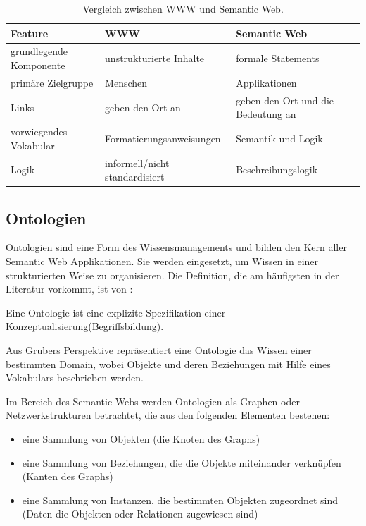 \begin{table}[h]
\begin{center}
\begin{tabular}{ | p{3 cm} | p{4 cm} | p{4 cm} | }
\hline
\textbf{Feature} & \textbf{WWW} & \textbf{Semantic Web} \\
\hline
grundlegende Komponente & unstrukturierte Inhalte & formale Statements \\ 
\hline
primäre Zielgruppe & Menschen & Applikationen \\ 
\hline
Links & geben den Ort an & geben den Ort und die Bedeutung an \\ 
\hline
vorwiegendes Vokabular & Formatierungsanweisungen & Semantik und Logik \\ 
\hline
Logik & informell/nicht standardisiert & Beschreibungslogik \\ 
\hline
\end{tabular}
\caption{Vergleich zwischen WWW und Semantic Web.}
\label{table:1}
\end{center}
\end{table}

\subsection{Ontologien}

Ontologien sind eine Form des Wissensmanagements und bilden den Kern aller Semantic Web Applikationen. 
Sie werden eingesetzt, um Wissen in einer strukturierten Weise zu organisieren.
Die Definition, die am häufigsten in der Literatur vorkommt, ist von \citet{gruber_translation_1993}:

\begin{definition}
  Eine Ontologie ist eine explizite Spezifikation einer Konzeptualisierung(Begriffsbildung).
\end{definition}

\noindent Aus Grubers Perspektive repräsentiert eine Ontologie das Wissen einer bestimmten Domain, wobei Objekte und deren Beziehungen mit Hilfe eines Vokabulars beschrieben werden. \citep[vgl.]{breitman_semantic_2007}

Im Bereich des Semantic Webs werden Ontologien als Graphen oder Netzwerkstrukturen betrachtet, die aus den folgenden Elementen bestehen:

\begin{itemize}
	\item eine Sammlung von Objekten (die Knoten des Graphs)
	\item eine Sammlung von Beziehungen, die die Objekte miteinander verknüpfen (Kanten des Graphs)
	\item eine Sammlung von Instanzen, die bestimmten Objekten zugeordnet sind (Daten die Objekten oder Relationen zugewiesen sind) \citep[vgl.]{davies_semantic_2006}
\end{itemize}

